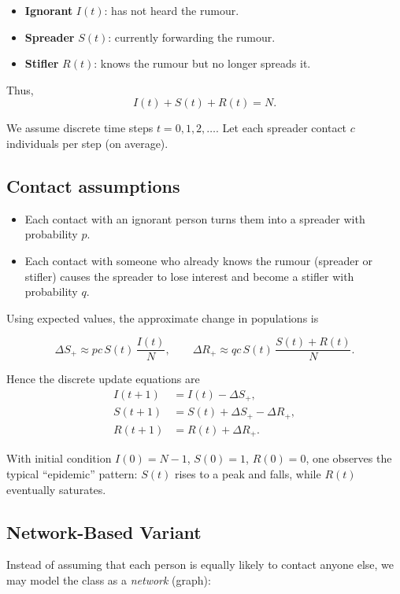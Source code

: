 \documentclass[11pt]{article}
\begin{document}
\begin{itemize}
    \item \textbf{Ignorant} $I(t)$: has not heard the rumour.
    \item \textbf{Spreader} $S(t)$: currently forwarding the rumour.
    \item \textbf{Stifler} $R(t)$: knows the rumour but no longer spreads it.
\end{itemize}

Thus,
\[
I(t) + S(t) + R(t) = N.
\]

We assume discrete time steps $t=0,1,2,\dots$. Let each spreader contact
$c$ individuals per step (on average).

\subsection*{Contact assumptions}
\begin{itemize}
    \item Each contact with an ignorant person turns them into a
    spreader with probability $p$.
    \item Each contact with someone who already knows the rumour
    (spreader or stifler) causes the spreader to lose interest and
    become a stifler with probability $q$.
\end{itemize}

Using expected values, the approximate change in populations is

\[
\Delta S_+ \approx p c\, S(t)\,\frac{I(t)}{N}, \qquad
\Delta R_+ \approx q c\, S(t)\,\frac{S(t)+R(t)}{N}.
\]

Hence the discrete update equations are
\[
\begin{aligned}
I(t+1) &= I(t) - \Delta S_+, \\
S(t+1) &= S(t) + \Delta S_+ - \Delta R_+, \\
R(t+1) &= R(t) + \Delta R_+.
\end{aligned}
\]

With initial condition $I(0)=N-1$, $S(0)=1$, $R(0)=0$, one observes the
typical ``epidemic'' pattern: $S(t)$ rises to a peak and falls, while
$R(t)$ eventually saturates.

\subsection*{Network-Based Variant}

Instead of assuming that each person is equally likely to contact anyone
else, we may model the class as a \emph{network} (graph):
\end{document}
